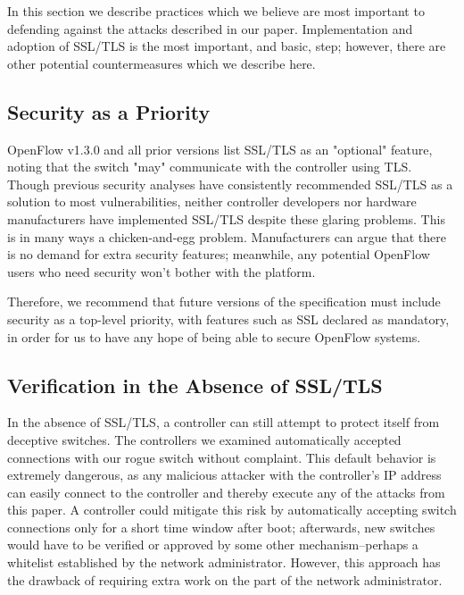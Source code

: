 In this section we describe practices which we believe are most important to defending against the attacks described in our paper. Implementation and adoption of SSL/TLS is the most important, and basic, step; however, there are other potential countermeasures which we describe here.

\subsection{Security as a Priority}

OpenFlow v1.3.0 and all prior versions list SSL/TLS as an "optional" feature, noting that the switch "may" communicate with the controller using TLS. Though previous security analyses have consistently recommended SSL/TLS as a solution to most vulnerabilities, neither controller developers nor hardware manufacturers have implemented SSL/TLS despite these glaring problems. This is in many ways a chicken-and-egg problem. Manufacturers can argue that there is no demand for extra security features; meanwhile, any potential OpenFlow users who need security won't bother with the platform.

Therefore, we recommend that future versions of the specification must include security as a top-level priority, with features such as SSL declared as mandatory, in order for us to have any hope of being able to secure OpenFlow systems. 

\subsection{Verification in the Absence of SSL/TLS}

In the absence of SSL/TLS,  a controller can still attempt to protect itself from deceptive switches. The controllers we examined automatically accepted connections with our rogue switch without complaint. This default behavior is extremely dangerous, as any malicious attacker with the controller's IP address can easily connect to the controller and thereby execute any of the attacks from this paper. A controller could mitigate this risk by automatically accepting switch connections only for a short time window after boot; afterwards, new switches would have to be verified or approved by some other mechanism--perhaps a whitelist established by the network administrator. However, this approach has the drawback of requiring extra work on the part of the network administrator.


